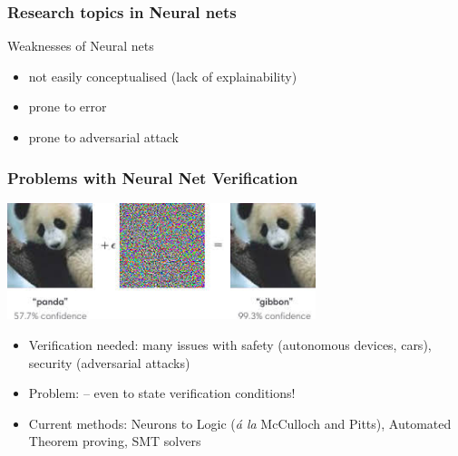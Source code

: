 \documentclass{beamer}
\begin{document}
\begin{frame}
\frametitle{Research topics in Neural nets}
\begin{block}{Weaknesses of Neural nets}
\begin{itemize}
	\item not easily conceptualised (\alert{lack of explainability})
	\item prone to error
	\item prone to adversarial attack
\end{itemize}
\end{block}
\end{frame}



\begin{frame}
\frametitle{Problems with Neural Net Verification}



\includegraphics[width=9cm]{panda}
\pause

\begin{itemize}
	\item Verification needed: many issues with safety (autonomous devices, cars), security (adversarial attacks)
	\item Problem: -- even to state verification conditions!
	\item Current methods: Neurons to Logic (\emph{\'a la} McCulloch and Pitts), Automated Theorem proving, SMT solvers
\end{itemize}
\end{frame}
\end{document}
